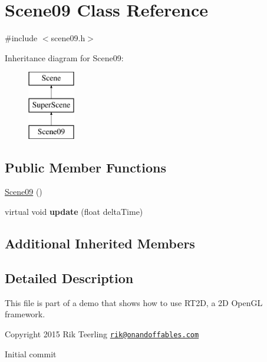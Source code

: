 \hypertarget{class_scene09}{}\section{Scene09 Class Reference}
\label{class_scene09}


{\ttfamily \#include $<$scene09.\+h$>$}

Inheritance diagram for Scene09\+:\begin{figure}[H]
\begin{center}
\leavevmode
\includegraphics[height=3.000000cm]{class_scene09}
\end{center}
\end{figure}
\subsection*{Public Member Functions}
\begin{DoxyCompactItemize}
\item 
\hyperlink{class_scene09_a983b7890f9713f0c5f1e0aaa4e294e65}{Scene09} ()
\item 
\mbox{\label{class_scene09_a6f138d71986fa190b38299e0f5277651}} 
virtual void {\bfseries update} (float delta\+Time)
\end{DoxyCompactItemize}
\subsection*{Additional Inherited Members}


\subsection{Detailed Description}
This file is part of a demo that shows how to use R\+T2D, a 2D Open\+GL framework.


\begin{DoxyItemize}
\item Copyright 2015 Rik Teerling \href{mailto:rik@onandoffables.com}{\tt rik@onandoffables.\+com}
\begin{DoxyItemize}
\item Initial commit 
\end{DoxyItemize}
\end{DoxyItemize}

